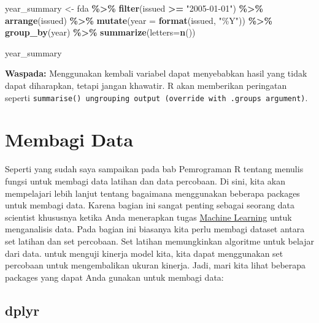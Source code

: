 \documentclass[
]{book}
\newenvironment{Shaded}{\begin{snugshade}}{\end{snugshade}}
\newcommand{\AttributeTok}[1]{\textcolor[rgb]{0.13,0.29,0.53}{#1}}
\newcommand{\FunctionTok}[1]{\textcolor[rgb]{0.13,0.29,0.53}{\textbf{#1}}}
\newcommand{\NormalTok}[1]{#1}
\newcommand{\OtherTok}[1]{\textcolor[rgb]{0.56,0.35,0.01}{#1}}
\newcommand{\SpecialCharTok}[1]{\textcolor[rgb]{0.81,0.36,0.00}{\textbf{#1}}}
\newcommand{\StringTok}[1]{\textcolor[rgb]{0.31,0.60,0.02}{#1}}
\begin{document}
\begin{Shaded}
\begin{Highlighting}[]
\NormalTok{year\_summary }\OtherTok{\textless{}{-}}\NormalTok{ fda }\SpecialCharTok{\%\textgreater{}\%}
  \FunctionTok{filter}\NormalTok{(issued }\SpecialCharTok{\textgreater{}=} \StringTok{"2005{-}01{-}01"}\NormalTok{) }\SpecialCharTok{\%\textgreater{}\%}
  \FunctionTok{arrange}\NormalTok{(issued) }\SpecialCharTok{\%\textgreater{}\%}
  \FunctionTok{mutate}\NormalTok{(}\AttributeTok{year =} \FunctionTok{format}\NormalTok{(issued, }\StringTok{"\%Y"}\NormalTok{)) }\SpecialCharTok{\%\textgreater{}\%}
  \FunctionTok{group\_by}\NormalTok{(year) }\SpecialCharTok{\%\textgreater{}\%}
  \FunctionTok{summarize}\NormalTok{(}\AttributeTok{letters=}\FunctionTok{n}\NormalTok{())}

\NormalTok{year\_summary}
\end{Highlighting}
\end{Shaded}

\textbf{Waspada:} Menggunakan kembali variabel dapat menyebabkan hasil yang tidak dapat diharapkan, tetapi jangan khawatir. R akan memberikan peringatan seperti \texttt{summarise()\ ungrouping\ output\ (override\ with\ .groups\ argument)}.

\hypertarget{membagi-data}{%
\section{Membagi Data}\label{membagi-data}}

Seperti yang sudah saya sampaikan pada bab Pemrograman R tentang menulis fungsi untuk membagi data latihan dan data percobaan. Di sini, kita akan mempelajari lebih lanjut tentang bagaimana menggunakan beberapa packages untuk membagi data. Karena bagian ini sangat penting sebagai seorang data scientist khususnya ketika Anda menerapkan tugas \href{https://bookdown.org/BaktiSiregar/data-science-for-beginners/Manipulation.html}{Machine Learning} untuk menganalisis data. Pada bagian ini biasanya kita perlu membagi dataset antara set latihan dan set percobaan. Set latihan memungkinkan algoritme untuk belajar dari data. untuk menguji kinerja model kita, kita dapat menggunakan set percobaan untuk mengembalikan ukuran kinerja. Jadi, mari kita lihat beberapa packages yang dapat Anda gunakan untuk membagi data:

\hypertarget{dplyr}{%
\subsection{dplyr}\label{dplyr}}
\end{document}
